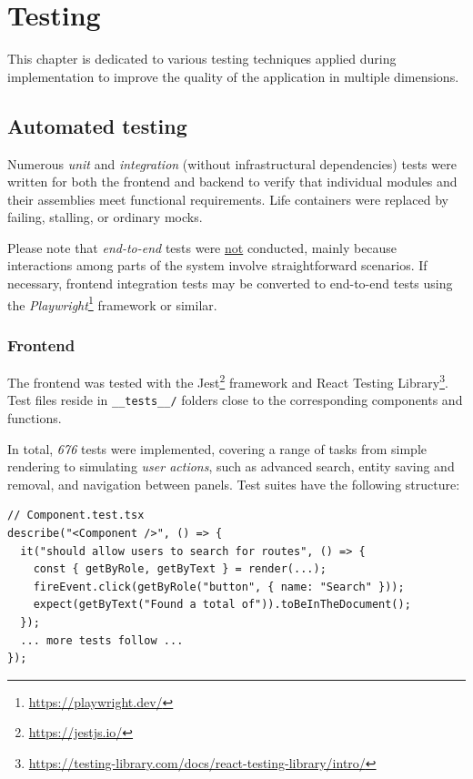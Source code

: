 \chapter{Testing}\label{chap:testing}

This chapter is dedicated to various testing techniques applied during implementation to improve the quality of the application in multiple dimensions.

\section{Automated testing}\label{sec:auto-testing}


Numerous \emph{unit} and \emph{integration} (without infrastructural dependencies) tests were written for both the frontend and backend to verify that individual modules and their assemblies meet functional requirements. Life containers were replaced by failing, stalling, or ordinary mocks.

Please note that \emph{end-to-end} tests were \underline{not} conducted, mainly because interactions among parts of the system involve straightforward scenarios. If necessary, frontend integration tests may be converted to end-to-end tests using the \emph{Playwright}\footnote{\href{https://playwright.dev/}{https://playwright.dev/}} framework or similar.

\subsection*{Frontend}

The frontend was tested with the Jest\footnote{\href{https://jestjs.io/}{https://jestjs.io/}} framework and React Testing Library\footnote{\href{https://testing-library.com/docs/react-testing-library/intro/}{https://testing-library.com/docs/react-testing-library/intro/}}. Test files reside in \texttt{\_\_tests\_\_/} folders close to the corresponding components and functions.

In total, \emph{676} tests were implemented, covering a range of tasks from simple rendering to simulating \emph{user actions}, such as advanced search, entity saving and removal, and navigation between panels. Test suites have the following structure:

\begin{verbatim}
// Component.test.tsx
describe("<Component />", () => {
  it("should allow users to search for routes", () => {
    const { getByRole, getByText } = render(...);
    fireEvent.click(getByRole("button", { name: "Search" }));
    expect(getByText("Found a total of")).toBeInTheDocument();
  });
  ... more tests follow ...
});
\end{verbatim}

